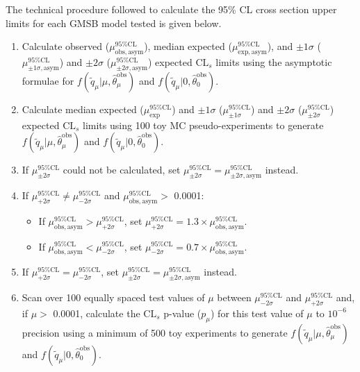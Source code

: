 \documentclass[dissertation.tex]{subfiles}
\begin{document}
The technical procedure followed to calculate the 95\% CL cross section upper limits for each GMSB model tested is given below.

\begin{enumerate}
\item Calculate observed ($\mu^{95\%\mathrm{CL}}_{\mathrm{obs,asym}}$), median expected ($\mu^{95\%\mathrm{CL}}_{\mathrm{exp,asym}}$), and $\pm1\sigma$ ($\mu^{95\%\mathrm{CL}}_{\pm1\sigma\mathrm{,asym}}$) and $\pm2\sigma$ ($\mu^{95\%\mathrm{CL}}_{\pm2\sigma\mathrm{,asym}}$) expected $\mbox{CL}_{s}$ limits using the asymptotic formulae for $f(\tilde{q}_{\mu} | \mu, \hat{\theta}_{\mu}^{\mathrm{obs}})$ and $f(\tilde{q}_{\mu} | 0, \hat{\theta}_{0}^{\mathrm{obs}})$.
\item Calculate median expected ($\mu^{95\%\mathrm{CL}}_{\mathrm{exp}}$) and $\pm1\sigma$ ($\mu^{95\%\mathrm{CL}}_{\pm1\sigma}$) and $\pm2\sigma$ ($\mu^{95\%\mathrm{CL}}_{\pm2\sigma}$) expected $\mbox{CL}_{s}$ limits using 100 toy MC pseudo-experiments to generate $f(\tilde{q}_{\mu} | \mu, \hat{\theta}_{\mu}^{\mathrm{obs}})$ and $f(\tilde{q}_{\mu} | 0, \hat{\theta}_{0}^{\mathrm{obs}})$.
\item If $\mu^{95\%\mathrm{CL}}_{\pm2\sigma}$ could not be calculated, set $\mu^{95\%\mathrm{CL}}_{\pm2\sigma} = \mu^{95\%\mathrm{CL}}_{\pm2\sigma\mathrm{,asym}}$ instead.
\item If $\mu^{95\%\mathrm{CL}}_{+2\sigma} \neq \mu^{95\%\mathrm{CL}}_{-2\sigma}$ and $\mu^{95\%\mathrm{CL}}_{\mathrm{obs,asym}} >$ 0.0001:
\begin{itemize}
\item If $\mu^{95\%\mathrm{CL}}_{\mathrm{obs,asym}} > \mu^{95\%\mathrm{CL}}_{+2\sigma}$, set $\mu^{95\%\mathrm{CL}}_{+2\sigma} = 1.3\times\mu^{95\%\mathrm{CL}}_{\mathrm{obs,asym}}$.
\item If $\mu^{95\%\mathrm{CL}}_{\mathrm{obs,asym}} < \mu^{95\%\mathrm{CL}}_{-2\sigma}$, set $\mu^{95\%\mathrm{CL}}_{-2\sigma} = 0.7\times\mu^{95\%\mathrm{CL}}_{\mathrm{obs,asym}}$.
\end{itemize}
\item If $\mu^{95\%\mathrm{CL}}_{+2\sigma} = \mu^{95\%\mathrm{CL}}_{-2\sigma}$, set $\mu^{95\%\mathrm{CL}}_{\pm2\sigma} = \mu^{95\%\mathrm{CL}}_{\pm2\sigma\mathrm{,asym}}$ instead.
\item Scan over 100 equally spaced test values of $\mu$ between $\mu^{95\%\mathrm{CL}}_{-2\sigma}$ and $\mu^{95\%\mathrm{CL}}_{+2\sigma}$ and, if $\mu >$ 0.0001, calculate the $\mbox{CL}_{s}$ p-value ($p_{\mu}$) for this test value of $\mu$ to $10^{-6}$ precision using a minimum of 500 toy experiments to generate $f(\tilde{q}_{\mu} | \mu, \hat{\theta}_{\mu}^{\mathrm{obs}})$ and $f(\tilde{q}_{\mu} | 0, \hat{\theta}_{0}^{\mathrm{obs}})$.

\end{enumerate}
\end{document}
